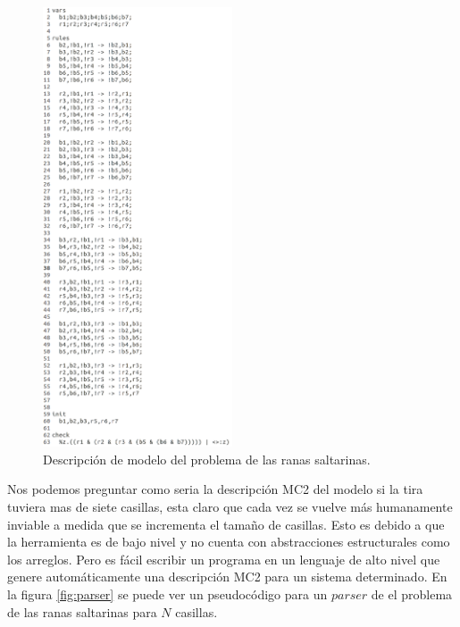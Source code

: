 \begin{figure}[H]
  \centering
  \includegraphics[width=0.5\textwidth]{Figures/ranas.png}
  \caption{Descripción de modelo del problema de las ranas saltarinas.}
  \label{fig:ranas}
\end{figure}

\noindent Nos podemos preguntar como seria la descripción MC2 del modelo si la tira tuviera mas de siete casillas, esta claro que cada vez se vuelve más humanamente inviable a medida que se incrementa el tamaño de casillas. Esto es debido a que la herramienta es de bajo nivel y no cuenta con abstracciones estructurales como los arreglos. Pero es fácil escribir un programa en un lenguaje de alto nivel que genere automáticamente una descripción MC2 para un sistema determinado. En la figura \ref{fig:parser} se puede ver un pseudocódigo para un $parser$ de el problema de las ranas saltarinas para $N$ casillas.

